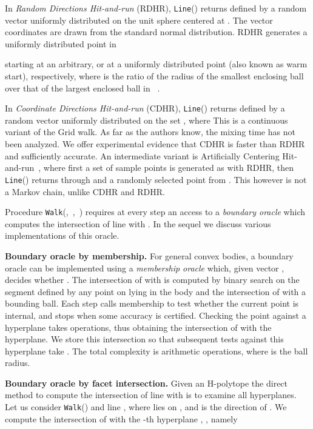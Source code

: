 \documentclass[11pt,a4paper]{article}
\def\Line{{\tt Line}}
\def\Walk{{\tt Walk}}
\begin{document}
In {\it Random Directions Hit-and-run} (RDHR),
\Line() returns  defined by a random vector
uniformly distributed on the unit sphere centered at .
The vector coordinates are drawn from the standard normal distribution.
RDHR generates a uniformly distributed point in  

starting at an arbitrary, or at
a uniformly distributed point (also known as warm start), respectively, 
where  is the ratio of the radius of the smallest enclosing 
ball over that of the largest enclosed ball in ~\cite{LovaszV06corner}.

In {\it Coordinate Directions Hit-and-run} (CDHR),
\Line() returns  defined by a random vector
uniformly distributed on the set ,
where 
This is a continuous variant of the Grid walk.  
As far as the authors know, the mixing time has not been analyzed.
We offer experimental evidence that CDHR is faster than RDHR and
sufficiently accurate.
An intermediate variant is Artificially Centering
Hit-and-run~\cite{Smith_AHNR98}, where first a set  of sample points
is generated as with RDHR, then \Line() returns  through  and a randomly
selected point from .
This however is not a Markov chain, unlike CDHR and RDHR.

Procedure \Walk(,\ ,\ ) requires at every step an access to a {\it boundary oracle} which computes the intersection of line  with .
In the sequel we discuss various implementations of this oracle. 

\vspace{.5em}
\textbf{Boundary oracle by membership.}
For general convex bodies, a boundary oracle can be implemented using a {\em membership oracle} which, given vector , decides whether .
The intersection of  with  is computed
by binary search on the segment defined by any point on  lying in
the body and the intersection of  with a bounding ball.
Each step calls membership to test whether the current point is internal,
and stops when some accuracy  is certified.
Checking the point against a hyperplane takes  operations,
thus obtaining the intersection of  with the hyperplane.
We store this intersection so that subsequent tests against
this hyperplane take .
The total complexity is  arithmetic operations,
where  is the ball radius. 

\textbf{Boundary oracle by facet intersection.}
Given an H-polytope  the direct method to compute the intersection of line  with  is to examine all  hyperplanes.
Let us consider \Walk() and
line ,
where  lies on , and  is the 
direction of .
We compute the intersection of  with
the -th hyperplane , , namely
\end{document}
